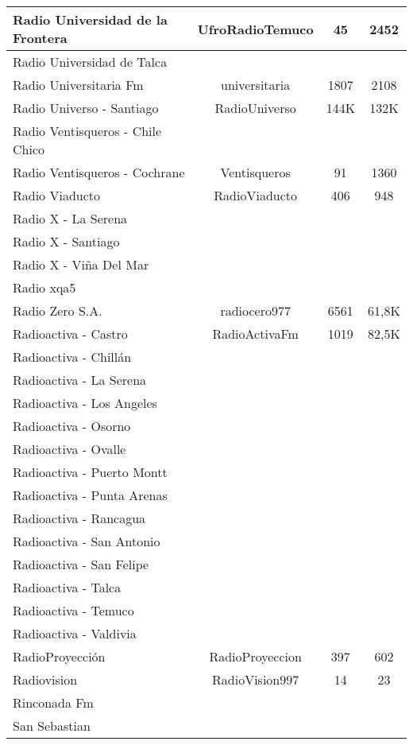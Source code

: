 \begin{center}
\begin{longtable}{| l | c | c | c |}
Radio Universidad de la Frontera	&	UfroRadioTemuco	&	45	&	2452	\\ \hline
Radio Universidad de Talca	&		&		&		\\ \hline
Radio Universitaria Fm	&	universitaria	&	1807	&	2108	\\ \hline
Radio Universo - Santiago	&	RadioUniverso	&	144K	&	132K	\\ \hline
Radio Ventisqueros - Chile Chico	&		&		&		\\ \hline
Radio Ventisqueros - Cochrane	&	Ventisqueros	&	91	&	1360	\\ \hline
Radio Viaducto	&	RadioViaducto	&	406	&	948	\\ \hline
Radio X - La Serena	&		&		&		\\ \hline
Radio X - Santiago	&		&		&		\\ \hline
Radio X - Viña Del Mar	&		&		&		\\ \hline
Radio xqa5	&		&		&		\\ \hline
Radio Zero S.A.	&	radiocero977	&	6561	&	61,8K	\\ \hline
Radioactiva - Castro	&	RadioActivaFm	&	1019	&	82,5K	\\ \hline
Radioactiva - Chillán	&		&		&		\\ \hline
Radioactiva - La Serena	&		&		&		\\ \hline
Radioactiva - Los Angeles	&		&		&		\\ \hline
Radioactiva - Osorno	&		&		&		\\ \hline
Radioactiva - Ovalle	&		&		&		\\ \hline
Radioactiva - Puerto Montt	&		&		&		\\ \hline
Radioactiva - Punta Arenas	&		&		&		\\ \hline
Radioactiva - Rancagua	&		&		&		\\ \hline
Radioactiva - San Antonio	&		&		&		\\ \hline
Radioactiva - San Felipe	&		&		&		\\ \hline
Radioactiva - Talca	&		&		&		\\ \hline
Radioactiva - Temuco	&		&		&		\\ \hline
Radioactiva - Valdivia	&		&		&		\\ \hline
RadioProyección	&	RadioProyeccion	&	397	&	602	\\ \hline
Radiovision	&	RadioVision997	&	14	&	23	\\ \hline
Rinconada Fm	&		&		&		\\ \hline
San Sebastian	&		&		&		\\ \hline

\end{longtable}
\end{center}
